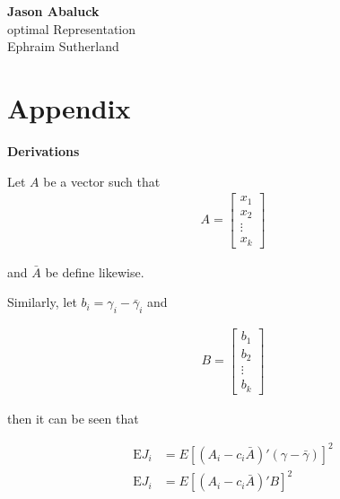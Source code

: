 \documentclass[12pt]{article}
\newcommand{\1}{\mathds{1}}
\newcommand{\E}{\mathrm{E}}
\begin{document}
\begin{center}
	{\large \bf Jason Abaluck }   \\ \large optimal Representation \\ Ephraim Sutherland
\end{center}

\tableofcontents








\section{Appendix}

\begin{center}
	{\large \bf Derivations }
\end{center}






% 




Let $A$ be a vector such that
\begin{align*}
	A = \begin{bmatrix}
		x_1 \\
		x_2 \\
		\vdots \\
		x_{k}
	\end{bmatrix}
\end{align*}

and $\bar{A}$ be define likewise.

Similarly, let $b_i = \gamma_i - \bar{\gamma}_i$ and

\begin{align*}
	B = \begin{bmatrix}
		b_1 \\
		b_2 \\
		\vdots \\
		b_{k}
	\end{bmatrix}
\end{align*}

then it can be seen that

\begin{align*}
    \E J_i &= E [(A_i - c_i \bar{A})'(\gamma - \bar{\gamma})]^2 \\
    \E J_i &= E [(A_i - c_i \bar{A})' B]^2 \\
\end{align*}



% 


\end{document}
